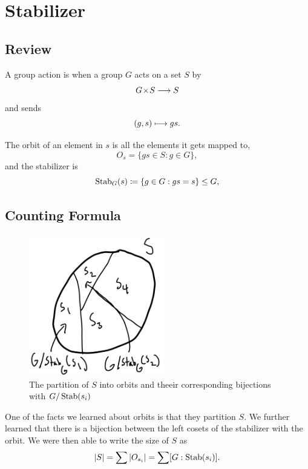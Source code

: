

\section{Stabilizer}

\subsection{Review}
A group action is when a group $G$ acts on a set $S$ by 
\[
G \hspace{0.05em}{\times}\hspace{0.05em} S \longrightarrow S
\]
and sends
\[
(g, s) \longmapsto gs.
\]

The orbit of an element in $s$ is all the elements it gets mapped to,
\[
O_s = \{gs \in S : g \in G\},
\]
and the stabilizer is 
\[
\operatorname{Stab}_G(s) \coloneqq \{g \in G: gs = s\} \leq G,
\]

\subsection{Counting Formula}
\begin{figure}[h]
    \centering
    \includegraphics[width=6cm]{Lecture Files and Images/lec18-orbits.png}
    \caption{The partition of $S$ into orbits and theeir corresponding bijections with $G/\operatorname{Stab}(s_i)$}
\end{figure}

One of the facts we learned about orbits is that they partition $S$. 
We further learned that there is a bijection between the left cosets of the stabilizer with the orbit.
We were then able to write the size of $S$ as 
\[
|S| = \sum |O_{s_i}| = \sum [G: \operatorname{Stab}(s_i)].
\]


